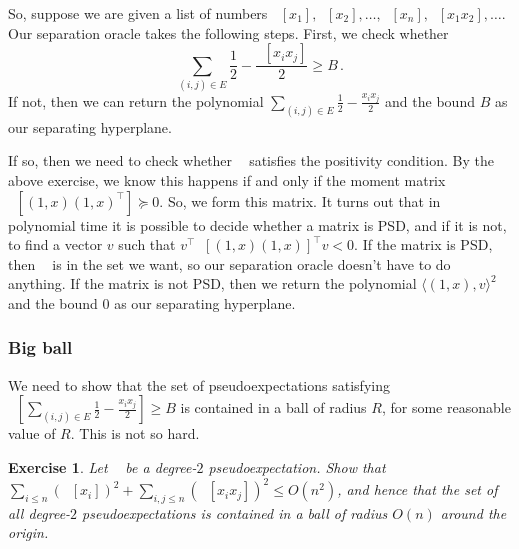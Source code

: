 \documentclass[11pt]{article}
\newtheorem{exercise}[theorem]{Exercise}
\newcommand{\brac}[1]{\left[ #1 \right]}
\newcommand{\iprod}[1]{\langle #1 \rangle}
\DeclareMathOperator{\pE}{\widetilde{\mathbb{E}}} %
\begin{document}
So, suppose we are given a list of numbers $\pE[x_1],\pE[x_2],\ldots,\pE[x_n],\pE[x_1 x_2],\ldots$.
Our separation oracle takes the following steps.
First, we check whether
\[
\sum_{(i,j) \in E} \frac 12 - \frac{\pE[x_i x_j]}{2} \geq B \, .
\]
If not, then we can return the polynomial $\sum_{(i,j) \in E} \frac 12 - \frac{x_i x_j}{2}$ and the bound $B$ as our separating hyperplane.

If so, then we need to check whether $\pE$ satisfies the positivity condition.
By the above exercise, we know this happens if and only if the moment matrix $\pE[(1,x)(1,x)^\top] \succeq 0$.
So, we form this matrix.
It turns out that in polynomial time it is possible to decide whether a matrix is PSD, and if it is not, to find a vector $v$ such that $v^\top \pE[(1,x)(1,x)]^\top v < 0$.
If the matrix is PSD, then $\pE$ is in the set we want, so our separation oracle doesn't have to do anything.
If the matrix is not PSD, then we return the polynomial $\iprod{(1,x), v}^2$ and the bound $0$ as our separating hyperplane.

\subsubsection{Big ball}
We need to show that the set of pseudoexpectations satisfying $\pE \brac{ \sum_{(i,j) \in E} \frac 12 - \frac{x_i x_j}{2}} \geq B$ is contained in a ball of radius $R$, for some reasonable value of $R$.
This is not so hard.

\begin{exercise}
Let $\pE$ be a degree-$2$ pseudoexpectation.
Show that $\sum_{i \leq n} (\pE[x_i])^2 + \sum_{i,j \leq n} (\pE[x_i x_j])^2 \leq O(n^2)$, and hence that the set of all degree-$2$ pseudoexpectations is contained in a ball of radius $O(n)$ around the origin.
\end{exercise}
\end{document}
